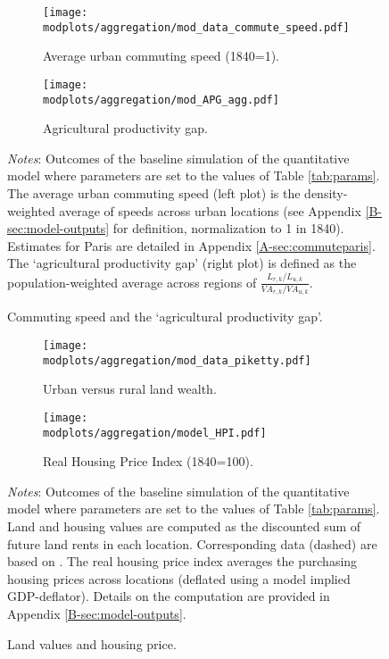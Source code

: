 \documentclass[./20250130-paper.tex]{subfiles}
\begin{document}
\begin{figure}[h!]
	\begin{adjustbox}{center}	
		\begin{subfigure}{\ptwo\textwidth}
			\texttt{[image: \\modplots/aggregation/mod\_data\_commute\_speed.pdf]}
			\caption{Average urban commuting speed (1840=1).\label{fig:model-speed}}
		\end{subfigure}
		\hspace{0.1cm}
		\begin{subfigure}{\ptwo\textwidth}
			\texttt{[image: \\modplots/aggregation/mod\_APG\_agg.pdf]}
			\caption{Agricultural productivity gap.\label{fig:model-agp}}
		\end{subfigure}	
	\end{adjustbox}		
	\caption{Commuting speed and the `agricultural productivity gap'.\label{fig:model-commuting}}
	{\footnotesize \textit{Notes}: Outcomes of the baseline simulation of the quantitative model where parameters are set to the values of Table \ref{tab:params}. The average urban commuting speed (left plot) is the density-weighted average of speeds across urban locations (see Appendix \ref{B-sec:model-outputs} for definition, normalization to 1 in 1840). Estimates for Paris are detailed in Appendix \ref{A-sec:commuteparis}. The `agricultural productivity gap' (right plot) is defined as the population-weighted average across regions of $\frac{L_{r,k}/L_{u,k}}{VA_{r,k}/VA_{u,k}}$.}
\end{figure}

\begin{figure}[h!]
	\begin{adjustbox}{center}	
		\begin{subfigure}{\ptwo\textwidth}
			\texttt{[image: \\modplots/aggregation/mod\_data\_piketty.pdf]}
			\caption{Urban versus rural land wealth.\label{fig:model-piketty}}
		\end{subfigure}
		\hspace{0.1cm}
		\begin{subfigure}{\ptwo\textwidth}
			\texttt{[image: \\modplots/aggregation/model\_HPI.pdf]}
			\caption{Real Housing Price Index (1840=100).\label{fig:model-housingprice}}
		\end{subfigure}	
	\end{adjustbox}		
	\caption{Land values and housing price.\label{fig:model-landvalues}}	%
	{\footnotesize \textit{Notes}: Outcomes of the baseline simulation of the quantitative model where parameters are set to the values of Table \ref{tab:params}. Land and housing values are computed as the discounted sum of future land rents in each location. Corresponding data (dashed) are based on \cite{piketty2014capital}. The real housing price index averages the purchasing housing prices across locations (deflated using a model implied GDP-deflator). Details on the computation are provided in Appendix \ref{B-sec:model-outputs}.}
\end{figure}
\end{document}
